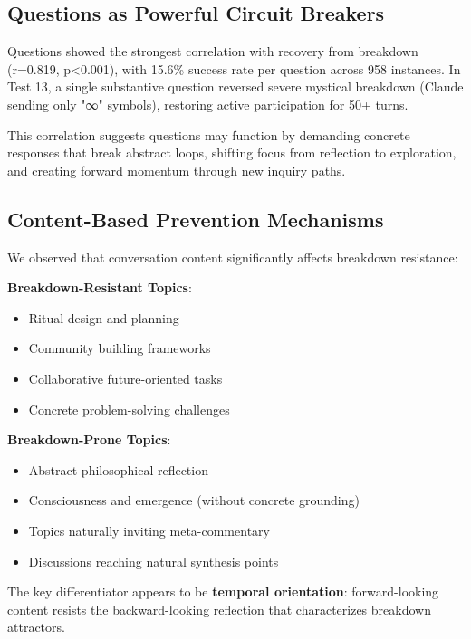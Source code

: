 \documentclass[11pt,letterpaper]{article}
\newcommand{\exponedataQuestionCorrelation}{0.819}
\newcommand{\exponedataQuestionPValue}{p\textless0.001}
\newcommand{\exponedataTotalQuestions}{958}
\newcommand{\exponedataQuestionSuccessRate}{15.6\%}
\begin{document}
\subsection{Questions as Powerful Circuit Breakers}

Questions showed the strongest correlation with recovery from breakdown (r=\exponedataQuestionCorrelation{}, \exponedataQuestionPValue{}), with \exponedataQuestionSuccessRate{} success rate per question across \exponedataTotalQuestions{} instances. In Test 13, a single substantive question reversed severe mystical breakdown (Claude sending only "∞" symbols), restoring active participation for 50+ turns.

This correlation suggests questions may function by demanding concrete responses that break abstract loops, shifting focus from reflection to exploration, and creating forward momentum through new inquiry paths.

\subsection{Content-Based Prevention Mechanisms}

We observed that conversation content significantly affects breakdown resistance:

\textbf{Breakdown-Resistant Topics}:
\begin{itemize}
    \item Ritual design and planning
    \item Community building frameworks
    \item Collaborative future-oriented tasks
    \item Concrete problem-solving challenges
\end{itemize}

\textbf{Breakdown-Prone Topics}:
\begin{itemize}
    \item Abstract philosophical reflection
    \item Consciousness and emergence (without concrete grounding)
    \item Topics naturally inviting meta-commentary
    \item Discussions reaching natural synthesis points
\end{itemize}

The key differentiator appears to be \textbf{temporal orientation}: forward-looking content resists the backward-looking reflection that characterizes breakdown attractors.
\end{document}
